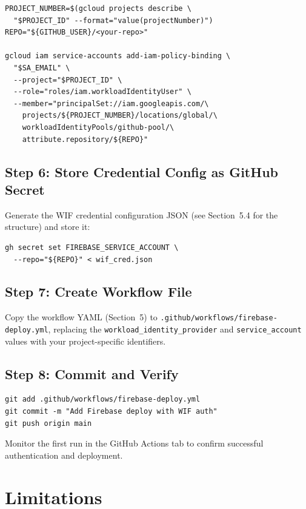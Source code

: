 \documentclass[11pt,a4paper]{article}
\theoremstyle{plainref}
\begin{document}
\begin{verbatim}
PROJECT_NUMBER=$(gcloud projects describe \
  "$PROJECT_ID" --format="value(projectNumber)")
REPO="${GITHUB_USER}/<your-repo>"

gcloud iam service-accounts add-iam-policy-binding \
  "$SA_EMAIL" \
  --project="$PROJECT_ID" \
  --role="roles/iam.workloadIdentityUser" \
  --member="principalSet://iam.googleapis.com/\
    projects/${PROJECT_NUMBER}/locations/global/\
    workloadIdentityPools/github-pool/\
    attribute.repository/${REPO}"
\end{verbatim}

\subsection{Step 6: Store Credential Config as GitHub Secret}

Generate the WIF credential configuration JSON (see Section~5.4 for the
structure) and store it:

\begin{verbatim}
gh secret set FIREBASE_SERVICE_ACCOUNT \
  --repo="${REPO}" < wif_cred.json
\end{verbatim}

\subsection{Step 7: Create Workflow File}

Copy the workflow YAML (Section~5) to
\texttt{.github/workflows/firebase-deploy.yml}, replacing the
\texttt{workload\_identity\_provider} and \texttt{service\_account}
values with your project-specific identifiers.

\subsection{Step 8: Commit and Verify}

\begin{verbatim}
git add .github/workflows/firebase-deploy.yml
git commit -m "Add Firebase deploy with WIF auth"
git push origin main
\end{verbatim}

Monitor the first run in the GitHub Actions tab to confirm successful
authentication and deployment.

\section{Limitations}
\end{document}
